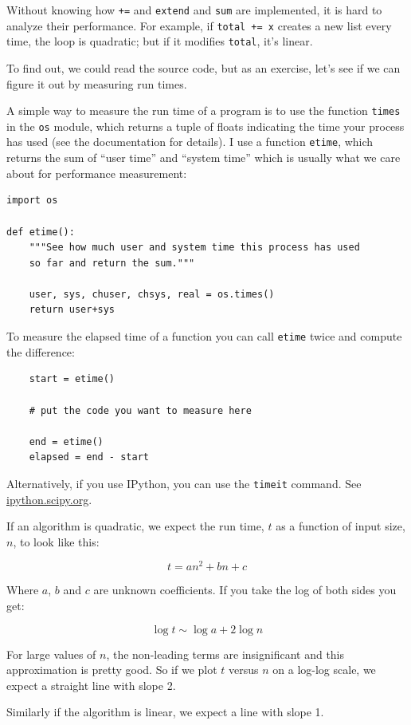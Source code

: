 \documentclass[10pt]{book}
\begin{document}
Without knowing how {\tt +=} and {\tt extend} and {\tt sum} are
implemented, it is hard to analyze their performance.  For example,
if {\tt total += x} creates a new list every time, the loop
is quadratic; but if it modifies {\tt total}, it's linear.

To find out, we could read the source code, but as an exercise, let's see
if we can figure it out by measuring run times.

A simple way to measure the run time of a program is to use
the function {\tt times} in the {\tt os} module, which returns
a tuple of floats indicating the time your process has used
(see the documentation for details).  I use a function {\tt etime},
which returns the sum of ``user time'' and ``system time'' which
is usually what we care about for performance measurement:

\begin{verbatim}
import os

def etime():
    """See how much user and system time this process has used
    so far and return the sum."""

    user, sys, chuser, chsys, real = os.times()
    return user+sys
\end{verbatim}

To measure the elapsed time of a function you can call
{\tt etime} twice and compute the difference:

\begin{verbatim}
    start = etime()

    # put the code you want to measure here

    end = etime()
    elapsed = end - start
\end{verbatim}

Alternatively, if you use IPython, you can use the
{\tt timeit} command. See \url{ipython.scipy.org}.

If an algorithm is quadratic, we expect the run time, $t$
as a function of input size, $n$, to look like this:

\[ t = a n^2 + b n + c \]

Where $a$, $b$ and $c$ are unknown coefficients.  If you take
the log of both sides you get:

\[ \log t \sim \log a + 2 \log n \]

For large values of $n$, the non-leading terms are insignificant
and this approximation is pretty good.  So if we plot $t$
versus $n$ on a log-log scale, we expect a straight line
with slope 2.

Similarly if the algorithm is linear, we expect a line with
slope 1.
\end{document}
